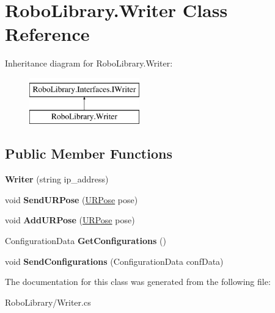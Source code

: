 \hypertarget{class_robo_library_1_1_writer}{}\section{Robo\+Library.\+Writer Class Reference}
\label{class_robo_library_1_1_writer}
Inheritance diagram for Robo\+Library.\+Writer\+:\begin{figure}[H]
\begin{center}
\leavevmode
\includegraphics[height=2.000000cm]{class_robo_library_1_1_writer}
\end{center}
\end{figure}
\subsection*{Public Member Functions}
\begin{DoxyCompactItemize}
\item 
\hypertarget{class_robo_library_1_1_writer_a3d530a563c96008ad6803535a0e72b66}{}\label{class_robo_library_1_1_writer_a3d530a563c96008ad6803535a0e72b66} 
{\bfseries Writer} (string ip\+\_\+address)
\item 
\hypertarget{class_robo_library_1_1_writer_aa60ea945142f96abb069c8c23ca77646}{}\label{class_robo_library_1_1_writer_aa60ea945142f96abb069c8c23ca77646} 
void {\bfseries Send\+U\+R\+Pose} (\hyperlink{class_robo_library_1_1_u_r_pose}{U\+R\+Pose} pose)
\item 
\hypertarget{class_robo_library_1_1_writer_a0698c2c9a3b2e75a705aa5e4e04dcc0d}{}\label{class_robo_library_1_1_writer_a0698c2c9a3b2e75a705aa5e4e04dcc0d} 
void {\bfseries Add\+U\+R\+Pose} (\hyperlink{class_robo_library_1_1_u_r_pose}{U\+R\+Pose} pose)
\item 
\hypertarget{class_robo_library_1_1_writer_a9cef38e8b8a8b9395a138f26dfe93817}{}\label{class_robo_library_1_1_writer_a9cef38e8b8a8b9395a138f26dfe93817} 
Configuration\+Data {\bfseries Get\+Configurations} ()
\item 
\hypertarget{class_robo_library_1_1_writer_a2506e4dad74aa2da0bab2377fa1f45e5}{}\label{class_robo_library_1_1_writer_a2506e4dad74aa2da0bab2377fa1f45e5} 
void {\bfseries Send\+Configurations} (Configuration\+Data conf\+Data)
\end{DoxyCompactItemize}


The documentation for this class was generated from the following file\+:\begin{DoxyCompactItemize}
\item 
Robo\+Library/Writer.\+cs\end{DoxyCompactItemize}

